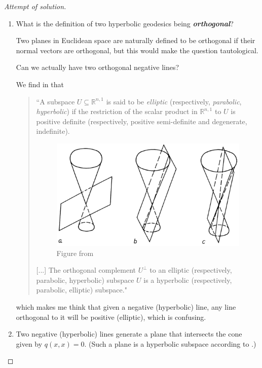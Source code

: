 \documentclass{article}
\newcommand{\R}{\mathbb{R}}
\begin{document}
\begin{proof}[Attempt of solution]\leavevmode
\begin{enumerate}[label*=\alph*.]
	\item
	\begin{question}
		What is the definition of two hyperbolic geodesics being \textbf{\textit{orthogonal}}?
		
		Two planes in Euclidean space are naturally defined to be orthogonal if their normal vectors are orthogonal, but this would make the question tautological.
	\end{question}
	\begin{question}
		Can we actually have two orthogonal negative lines? 
		
		We find in \cite{vinberg} that
		\begin{quotation}
			{``A subspace $U\subseteq \R^{n,1}$ is said to be} \textit{elliptic} (respectively, \textit{parabolic}, \textit{hyperbolic}) if the restriction of the scalar product in $\R^{n,1}$ to $U$ is positive definite (respectively, positive semi-definite and degenerate, indefinite).
			\begin{figure}[H]
				\centering
				\includegraphics[width=0.7\linewidth]{../home-assignment5/vinberg}
				\caption*{Figure from \cite{vinberg}}
				\label{fig:vinberg}
			\end{figure}
			[...] The orthogonal complement $U^\perp$ to an elliptic (respectively, parabolic, hyperbolic) subspace $U$ is a hyperbolic (respectively, parabolic, elliptic) subspace."
		\end{quotation}
			which makes me think that given a negative (hyperbolic) line, any line orthogonal to it will be positive (elliptic), which is confusing.
		\end{question}
		
		\item 
			\begin{question}
				Two negative (hyperbolic) lines generate a plane that intersects the cone given by $q(x,x)=0$. (Such a plane is a hyperbolic subspace according to \cite{vinberg}.)
			

\end{question}
\end{enumerate}
\end{proof}
\end{document}
